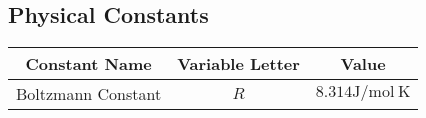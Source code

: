 \subsection{Physical Constants} \label{app:Physical Constants}
	\begin{table}[h!]
		\centering
		\begin{tabular}{|c|c|c|}
			\hline
			Constant Name & Variable Letter & Value \\ \hline
			Boltzmann Constant & $R$ & $8.314 \si{\joule / \mole~\kelvin}$ \\ \hline
		\end{tabular}
	\end{table}